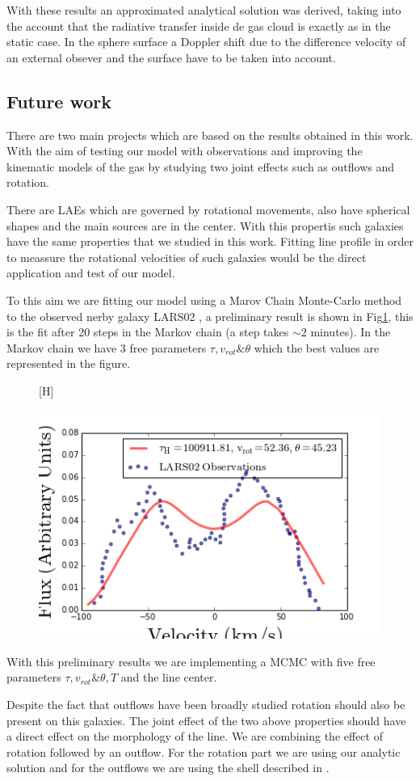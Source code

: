 
With these results an approximated analytical solution was derived, 
taking into the account that the radiative transfer inside de gas
cloud is exactly as in the static case. In the sphere surface
a Doppler shift due to the difference velocity of an external 
obsever and the surface have to be taken into account.  


\subsection{Future work}

There are two main projects which are based on the results obtained in 
this work. With the aim of testing our model with observations and
improving the kinematic models of the gas by studying two joint effects
such as outflows and rotation.  

There are LAEs which are governed by rotational movements, also 
have spherical shapes and the main \ly sources are in the center. 
With this propertis such galaxies have the same properties 
that we studied in this work.  
Fitting \ly line profile in order  to meassure the rotational 
velocities of such galaxies would be the direct application 
and test of our model. 

To this aim we are fitting our model using a Marov Chain Monte-Carlo 
method to the observed nerby galaxy LARS02 \citep{LARS}, a preliminary 
result is shown in Fig\ref{fig:LARS}, this is the fit after 20 steps
in the Markov chain (a step takes $\sim 2$ minutes). In the Markov
chain we have 3 free parameters $\tau, v_{rot} \& \theta$ which the best
values are represented in the figure.

\begin{figure}\label{fig:LARS}[H]
\begin{center}
\includegraphics[scale=0.8]{../Figures/LARS02_fit.png}
\end{center}
\end{figure}

With this preliminary results we are implementing a MCMC with five free
parameters  $\tau, v_{rot} \& \theta, T$ and the line center.

Despite the fact that outflows have been broadly studied rotation should 
also be present on this galaxies. The joint effect of the two above properties 
should have a direct effect on the morphology of the \lya line. We are 
 combining the effect of rotation followed by an outflow. For the rotation
part we are using our analytic solution and for the outflows
we are using the shell described in \citep{Verhamme12}. 
